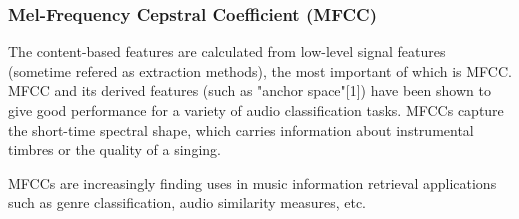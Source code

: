 \documentclass[paper=a4, fontsize=11pt, DIV=13]{scrartcl}
\begin{document}
\subsubsection{Mel-Frequency Cepstral Coefficient (MFCC) }
The content-based features are calculated from low-level signal features (sometime refered as extraction methods), the most important of which is MFCC. MFCC and its derived features (such as "anchor space"[1]) have been shown to give good performance for a variety of audio classification tasks. MFCCs capture the short-time spectral shape, which carries information about instrumental timbres or the quality of a singing. 


%

MFCCs are increasingly finding uses in music information retrieval applications such as genre classification, audio similarity measures, etc.

%
%
\end{document}
